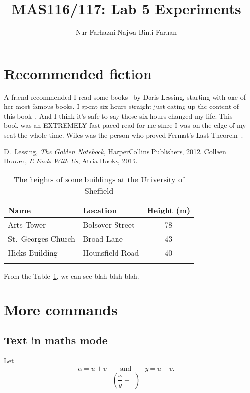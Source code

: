 \documentclass[11pt, a4paper]{amsart}
\title{MAS116/117: Lab 5 Experiments}
\author{Nur Farhazni Najwa Binti Farhan}
\newcommand{\otoprule}{\midrule[\heavyrulewidth]}
\begin{document}
 
\maketitle
\tableofcontents
\section*{Recommended fiction} %
A friend recommended I read some books~\cite{Lessing:Notebook} by Doris Lessing, starting with one of her most famous books. I spent six hours straight just eating up the content of this book~\cite{Coho:iewu}. And I think it's safe to say those six hours changed my life.  This book was an EXTREMELY fast-paced read for me since I was on the edge of my seat the whole time. 
Wiles was the person who proved Fermat's Last Theorem~\cite[Theorem~2.1]{Wiles:fermats-theorem}. %

\begin{thebibliography}{99} %
		D.~Lessing,
		\emph{The Golden Notebook},
		HarperCollins Publishers, 2012.
		Colleen Hoover,
		\emph{It Ends With Us},
		Atria Books, 2016.
\end{thebibliography}

\begin{table}[tbh]
	\begin{center}
		\begin{tabular}{llc} %
			\toprule %
			Name & Location & Height (m)\\ 
			\otoprule
			Arts Tower & Bolsover Street & 78\\
			St.~Georges Church & Broad Lane & 43\\
			Hicks Building & Hounsfield Road & 40\\
			\bottomrule\\ %
		\end{tabular}
		\caption{The heights of some buildings at the University of Sheffield}  %
		\label{table:building-heights} %
	\end{center}
\end{table}
From the Table~\ref{table:building-heights}, we can see blah blah blah.

\section{More commands}
\subsection{Text in maths mode}
Let 
\[
    \alpha = u +v\qquad \text{and}\qquad y = u - v. %
\]
\[
     \left(\frac{x}{y} + 1\right) %
\]
\end{document}
